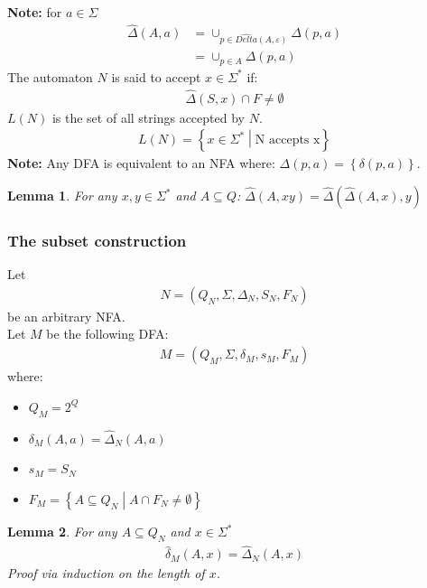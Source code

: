 \documentclass[a4paper]{article}
\newtheorem{lemma}{Lemma}
\begin{document}
        \\\textbf{Note:} for $a\in\Sigma$
        \begin{align*}
            \hat{\Delta}(A,a)&=\cup_{p\in\hat{Delta}(A,\varepsilon)}\Delta(p,a)\\
            &=\cup_{p\in A}\Delta(p,a)
        \end{align*}
        The automaton $N$ is said to accept $x\in\Sigma^*$ if:
        \begin{align*}
            \hat{\Delta}(S,x)\cap F \neq \emptyset
        \end{align*}
        $L(N)$ is the set of all strings accepted by $N$.
        \begin{align*}
            L(N)=\left\{ x\in\Sigma^* \middle | \mbox{N accepts x} \right\}
        \end{align*}
        \textbf{Note:} Any DFA is equivalent to an NFA where:
        $\Delta(p,a) = \left\{ \delta(p,a) \right\}$.
        \begin{lemma}
            For any $x,y\in\Sigma^*$ and $A\subseteq Q$: $\hat{\Delta}(A,xy)=\hat{\Delta}(\hat{\Delta}(A,x),y)$
        \end{lemma}
        \subsubsection{The subset construction}
        Let
        \begin{align*}
            N=(Q_N,\Sigma,\Delta_N,S_N,F_N)
        \end{align*}
        be an arbitrary NFA.\\
        Let $M$ be the following DFA:
        \begin{align*}
            M=(Q_M, \Sigma, \delta_M, s_M, F_M)
        \end{align*}
        where:
        \begin{itemize}
            \item $Q_M = 2^Q$
            \item $\delta_M(A,a)=\hat{\Delta}_N(A,a)$
            \item $s_M=S_N$
            \item $F_M=\left\{ A\subseteq Q_N \middle | A \cap F_N \neq \emptyset \right\}$
        \end{itemize}

        \begin{lemma}
            For any $A\subseteq Q_N$ and $x\in\Sigma^*$
            \begin{align*}
                \hat{\delta}_M(A,x) = \hat{\Delta}_N(A,x)
            \end{align*}
            Proof via induction on the length of $x$.
        \end{lemma}
\end{document}
